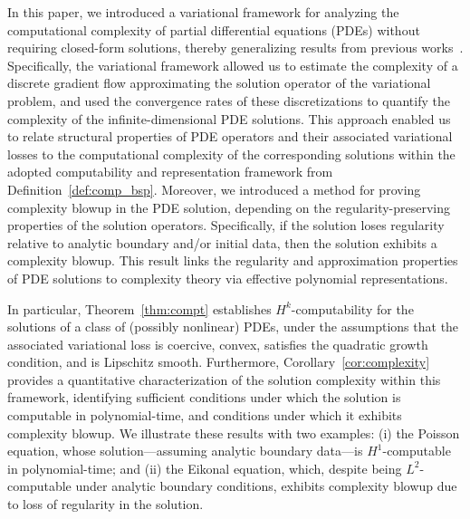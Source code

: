\documentclass[pdflatex]{sn-jnl}%
\begin{document}
In this paper, we introduced a variational framework for analyzing the computational complexity of partial differential equations (PDEs) without requiring closed-form solutions, thereby generalizing results from previous works~\cite{bacho2023complexityblowupsolutionslaplace,Pour-El1989-yg}. Specifically, the variational framework allowed us to estimate the complexity of a discrete gradient flow approximating the solution operator of the variational problem, and used the convergence rates of these discretizations to quantify the complexity of the infinite-dimensional PDE solutions. This approach enabled us to relate structural properties of PDE operators and their associated variational losses to the computational complexity of the corresponding solutions within the adopted computability and representation framework from Definition~\ref{def:comp_bsp}. Moreover, we introduced a method for proving complexity blowup in the PDE solution, depending on the regularity-preserving properties of the solution operators. Specifically, if the solution loses regularity relative to analytic boundary and/or initial data, then the solution exhibits a complexity blowup. This result links the regularity and approximation properties of PDE solutions to complexity theory via effective polynomial representations.

In particular, Theorem~\ref{thm:compt} establishes $H^k$-computability for the solutions of a class of (possibly nonlinear) PDEs, under the assumptions that the associated variational loss is coercive, convex, satisfies the quadratic growth condition, and is Lipschitz smooth. Furthermore, Corollary~\ref{cor:complexity} provides a quantitative characterization of the solution complexity within this framework, identifying sufficient conditions under which the solution is computable in polynomial-time, and conditions under which it exhibits complexity blowup. We illustrate these results with two examples: (i) the Poisson equation, whose solution—assuming analytic boundary data—is $H^1$-computable in polynomial-time; and (ii) the Eikonal equation, which, despite being $L^2$-computable under analytic boundary conditions, exhibits complexity blowup due to loss of regularity in the solution.
\end{document}
